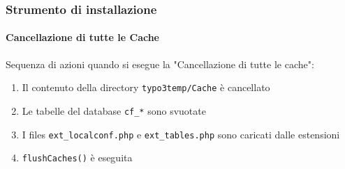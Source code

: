 
\begin{frame}[fragile]
        \frametitle{Strumento di installazione}
        \framesubtitle{Cancellazione di tutte le Cache}

	Sequenza di azioni quando si esegue la "Cancellazione di tutte le cache":

	\begin{enumerate}
		\item Il contenuto della directory \texttt{typo3temp/Cache} è cancellato
		\item Le tabelle del database \texttt{cf\_*} sono svuotate
		\item I files \texttt{ext\_localconf.php} e \texttt{ext\_tables.php}\newline
			sono caricati dalle estensioni
		\item \texttt{flushCaches()} è eseguita
	\end{enumerate}

\end{frame}


